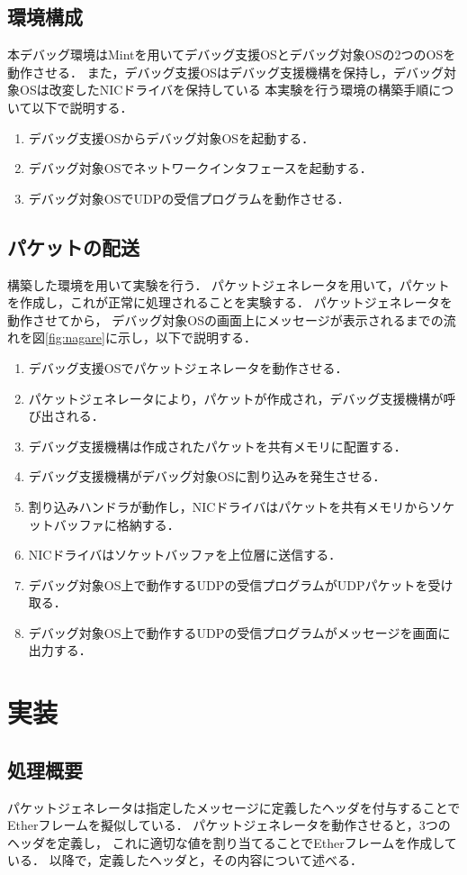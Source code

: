 \documentclass[12pt]{jsarticle}
\begin{document}
\subsection{環境構成}
本デバッグ環境はMintを用いてデバッグ支援OSとデバッグ対象OSの2つのOSを動作させる．
また，デバッグ支援OSはデバッグ支援機構を保持し，デバッグ対象OSは改変したNICドライバを保持している
本実験を行う環境の構築手順について以下で説明する．
\begin{enumerate}
    \item デバッグ支援OSからデバッグ対象OSを起動する．
    \item デバッグ対象OSでネットワークインタフェースを起動する．
    \item デバッグ対象OSでUDPの受信プログラムを動作させる．
\end{enumerate}
\subsection{パケットの配送}
構築した環境を用いて実験を行う．
パケットジェネレータを用いて，パケットを作成し，これが正常に処理されることを実験する．
パケットジェネレータを動作させてから，
デバッグ対象OSの画面上にメッセージが表示されるまでの流れを図\ref{fig:nagare}に示し，以下で説明する．
\begin{enumerate}
    \item デバッグ支援OSでパケットジェネレータを動作させる．
    \item パケットジェネレータにより，パケットが作成され，デバッグ支援機構が呼び出される．
    \item デバッグ支援機構は作成されたパケットを共有メモリに配置する．
    \item デバッグ支援機構がデバッグ対象OSに割り込みを発生させる．
    \item 割り込みハンドラが動作し，NICドライバはパケットを共有メモリからソケットバッファに格納する．
    \item NICドライバはソケットバッファを上位層に送信する．
    \item デバッグ対象OS上で動作するUDPの受信プログラムがUDPパケットを受け取る．
    \item デバッグ対象OS上で動作するUDPの受信プログラムがメッセージを画面に出力する．
\end{enumerate}
\section{実装}
\subsection{処理概要}
パケットジェネレータは指定したメッセージに定義したヘッダを付与することで
Etherフレームを擬似している．
パケットジェネレータを動作させると，3つのヘッダを定義し，
これに適切な値を割り当てることでEtherフレームを作成している．
以降で，定義したヘッダと，その内容について述べる．
\end{document}
